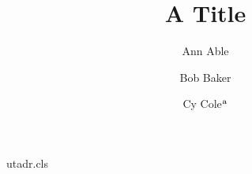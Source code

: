 \begin{filecontents*}[overwrite]{utadr.cls}
\def\theaddress{\alph{address}}
\def\@makeadmark#1{\mbox{$^{\rm #1}$}}
\def\addressmark{\stepcounter{address}\xdef\@tempb{\theaddress}\@makeadmark{\@tempb}}
\def\address#1{\addressmark\begingroup
  \xdef\@tempa{\theaddress}\let\\=\relax
  \def\protect{\noexpand\protect\noexpand}\xdef\@address{\leavevmode \@address
  \quad \vtop{\protect\addresstext{\@tempa}{#1}}}\endgroup}
\def\addresstext#1#2{\leavevmode\@makeadmark{#1}#2\par}
\def\@address{}
\def\@maketitle{\begin{center}{\LARGE\@title\par}\vskip1em{\large\begin{tabular}[t]{c}\@author\end{tabular}\par}\vskip1em
  {\small\it\@address}\end{center}}
\end{filecontents*}
\documentclass{utadr}

\title{A Title}
\author{Ann Able \address{Univ A, Town} \and Bob Baker \address{Univ B, City} \and Cy Cole$^{\rm a}$}
\maketitle
Text.

